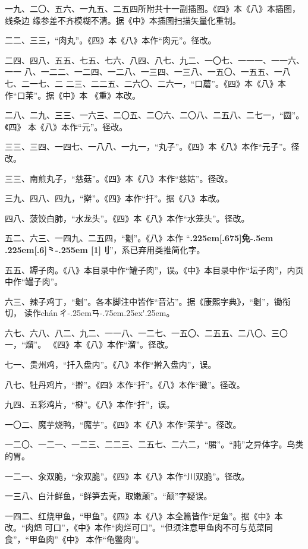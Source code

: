 \begin{list}{}
一九、二〇、五六、一九五、二五四所附共十一副插图。《四》本《八》本插图，线条边
缘参差不齐模糊不清。据《中》本插图扫描矢量化重制。

二二、三三，“肉丸”。《四》本《八》本作“肉元”。径改。

二四、四八、五五、七五、七六、八四、八七、九二、一〇七、一一一、一一六、一一
八、一二二、一二四、一二八、一三四、一三八、一五〇、一五五、一八七、二一七、二
二三、二二五、二六〇、二六一，“口蘑”。《四》本《八》本作“口茉”。据《中》本
《重》本改。

二八、二九、三三、一六三、二〇五、二〇六、二〇八、二五八、二七一，“圆”。《四》
本《八》本作“元”。径改。

三三、三四、一四七、一八八、一九一，“丸子”。《四》本《八》本作“元子”。径改。

三三、南煎丸子，“慈菇”。《四》本《八》本作“慈姑”。径改。

三九、四八、四九，“擀”。《四》本作“扞”。据《八》本改。

四八、菠饺白肺，“水龙头”。《四》本《八》本作“水笼头”。径改。

五二、六三、一四九、二五四，“劖”。《八》本作
“{\bfseries\raise.225em\hbox{\scalebox{.6}[.675]{免}}\kern-.5em%
\lower.225em\hbox{\scalebox{.6}[.6]{⺀}}\kern-.255em%
\scalebox{.6}[1]{刂}}”，系已弃用类推简化字。

五五、罈子肉。《八》本目录中作“罐子肉”，误。《中》本目录中作“坛子肉”，内页
中作“罎子肉”。

六三、辣子鸡丁，“劖”。各本脚注中皆作“音沾”。据《康熙字典》，“劖”，锄衔切，
读作{ch\'{a}n}\,{ㄔ\kern-.25emㄢ\kern-.75em\raise.25ex\hbox{\'{}}\kern.25em}。

六七、六八、八二、九二、一一八、一二七、一五〇、二五五、二八〇、三〇一，“熘”。
《四》本《八》本作“溜”。径改。

七一、贵州鸡，“扦入盘内”。《八》本作“擀入盘内”，误。

八七、牡丹鸡片，“擀”。《四》本作“扞”。《八》本作“撖”。径改。

九四、五彩鸡片，“㮟”。《八》本作“扞”，误。

一〇二、魔芋烧鸭，“魔芋”。《四》本《八》本作“茉芋”。径改。

一二〇、一二一、一二三、二二三、二五七、二六二，“𬂁”。“肫”之异体字。鸟类的胃。

一二一、汆双脆，“汆双脆”。《四》本《八》本作“川双脆”。径改。

一三八、白汁鲜鱼，“鲜笋去壳，取嫩颠”。“颠”字疑误。

一四二、红烧甲鱼，“甲鱼”。《四》本《八》本全篇皆作“足鱼”。据《中》本改。“肉𤆵
可口”，《中》本作“肉烂可口”。“但须注意甲鱼肉不可与苋菜同食”，“甲鱼肉”《中》
本作“龟鳖肉”。


\end{list}
